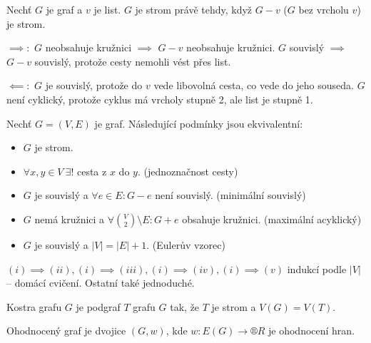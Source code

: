 \documentclass[12pt]{article}					%
\begin{document}
    \begin{veta}
        Nechť $G$ je graf a $v$ je list. $G$ je strom právě tehdy, když $G-v$ ($G$ bez vrcholu $v$) je strom.

        \begin{dukazin}
            $\implies:$ $G$ neobsahuje kružnici $\implies$ $G-v$ neobsahuje kružnici. $G$ souvislý $\implies$ $G-v$ souvislý, protože cesty nemohli vést přes list.

            $\impliedby:$ $G$ je souvislý, protože do $v$ vede libovolná cesta, co vede do jeho souseda. $G$ není cyklický, protože cyklus má vrcholy stupně 2, ale list je stupně 1.
        \end{dukazin}
    \end{veta}

    \begin{veta}
        Nechť $G=(V, E)$ je graf. Následující podmínky jsou ekvivalentní:

        \begin{itemize}
            \item $G$ je strom.
            \item $\forall x, y \in V\ \exists!$ cesta z $x$ do $y$. (jednoznačnost cesty)
            \item $G$ je souvislý a $\forall e\in E: G-e$ není souvislý. (minimální souvislý)
            \item $G$ nemá kružnici a $\forall \binom{V}{2} \setminus E: G+e$ obsahuje kružnici. (maximální acyklický)
            \item $G$ je souvislý a $|V| = |E| + 1$. (Eulerův vzorec)
        \end{itemize}

        \begin{dukazin}
            $(i) \implies (ii), (i) \implies (iii), (i) \implies (iv), (i) \implies (v)$ indukcí podle $|V|$ -- domácí cvičení. Ostatní také jednoduché.
        \end{dukazin}
    \end{veta}


    \begin{definice}[Kostra]
        Kostra grafu $G$ je podgraf $T$ grafu $G$ tak, že $T$ je strom a $V(G) = V(T)$.
    \end{definice}

    \begin{definice}
        Ohodnocený graf je dvojice $(G, w)$, kde $w: E(G) \rightarrow ®R$ je ohodnocení hran.
    \end{definice}
\end{document}
